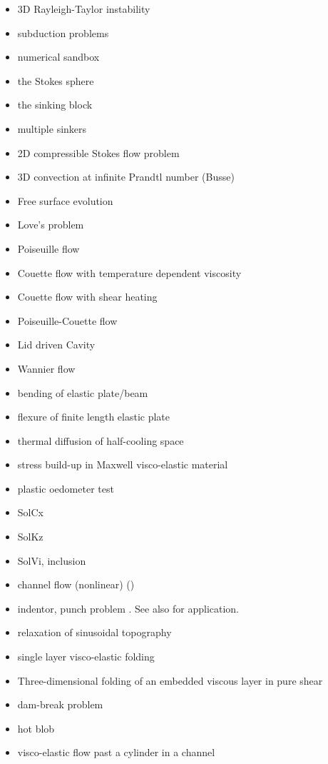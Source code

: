 \begin{itemize}
\item 3D Rayleigh-Taylor instability \cite{fukk08,vosc15}
\item subduction problems \cite{scbe08,vack08,cehg14}
\item numerical sandbox \cite{bbeg06,maie12,busa16,gltf18}
\item the Stokes sphere \cite{galemanual}
\item the sinking block \cite{thie11,cehg14,gery10,geyu03,mamo08,mishin11,fumt11,maie12}
\item multiple sinkers \cite{mabl14,mabl15}
\item 2D compressible Stokes flow problem \cite{itki94,tagu07,lezh08,kilv10,lizh13}
\item 3D convection at infinite Prandtl number (Busse) \cite{bucc93,trha98}
\item Free surface evolution \cite{crsg12}
\item Love's problem \cite{bebe04}
\item Poiseuille flow \cite{fojg94,fuku11,tagm09}
\item Couette flow with temperature dependent viscosity \cite{egat10,demh19}
\item Couette flow with shear heating \cite{egat10}
\item Poiseuille-Couette flow \cite{fusc13}
\item Lid driven Cavity \cite{foth79,ghgs82,bope98,kawa61}
\item Wannier flow \cite{wann50,yemu99}
\item bending of elastic plate/beam \cite{cehg14,boht08a,vosc15,egat10,demh19}
\item flexure of finite length elastic plate \cite{chtl13}
\item thermal diffusion of half-cooling space \cite{chtl13}
\item stress build-up in Maxwell visco-elastic material \cite{geyu07,chtl13,egat10,demh19}
\item plastic oedometer test  \cite{chtl13}
\item SolCx \cite{mamo08,demh19}
\item SolKz \cite{mamo08,demh19}
\item SolVi, inclusion \cite{kapo06,maie12,deka08,bepo10,vosc15,demh19}
\item channel flow (nonlinear) \cite{maie12,frbt19,gery10,egat10} (\bscthesis) 
\item indentor, punch problem \cite{engl82,thfb08,mota77,gepd98,gltf18}. See also \cite{hukm03,fojd04,gerb12} for application.
\item relaxation of sinusoidal topography \cite{crsg12,robh17}
\item single layer visco-elastic folding \cite{vosc15}
\item Three-dimensional folding of an embedded viscous layer in pure shear \cite{flet91}
\item dam-break problem \cite{moeb99,bacp07,liir07,lemx08,homa09,anco09,grdn97,hini81,basd08}
\item hot blob \cite{bugs09,fumt11}
\item visco-elastic flow past a cylinder in a channel \cite{bepo10}
\end{itemize}

